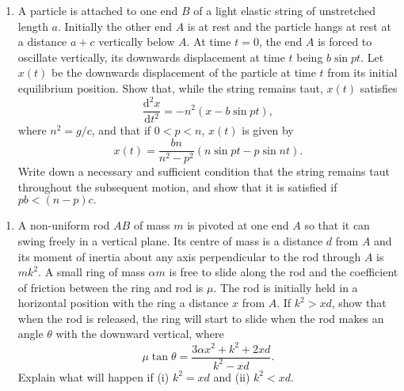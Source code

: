 \documentclass[a4, 11pt]{report}
\newlength{\qspace}
\newcounter{qnumber}
\newenvironment{question}%
 {\vspace{\qspace}
  \begin{enumerate}[\bfseries 1\quad][10]%
    \setcounter{enumi}{\value{qnumber}}%
    \item%
 }
{
  \end{enumerate}
  \filbreak
  \stepcounter{qnumber}
 }
\begin{document}
\begin{question}	
A particle is attached to one end $B$ of a light elastic string of
unstretched length $a$. Initially the other end $A$ is at rest and
the particle hangs at rest at a distance $a+c$ vertically below $A$.
At time $t=0$, the end $A$ is forced to oscillate vertically, its
downwards displacement at time $t$ being $b\sin pt$. Let $x(t)$
be the downwards displacement of the particle at time $t$ from its
initial equilibrium position. Show that, while the string remains
taut, $x(t)$ satisfies 
\[
\frac{\mathrm{d}^{2}x}{\mathrm{d}t^{2}}=-n^{2}(x-b\sin pt),
\]
where $n^{2}=g/c$, and that if $0<p<n$, $x(t)$ is given by 
\[
x(t)=\frac{bn}{n^{2}-p^{2}}(n\sin pt-p\sin nt).
\]
Write down a necessary and sufficient condition that the string remains
taut throughout the subsequent motion, and show that it is satisfied
if $pb<(n-p)c.$ 
\end{question}


\begin{question}
A non-uniform rod $AB$ of mass $m$ is pivoted at one end $A$ so
that it can swing freely in a vertical plane. Its centre of mass is
a distance $d$ from $A$ and its moment of inertia about any axis
perpendicular to the rod through $A$ is $mk^{2}.$ A small ring of
mass $\alpha m$ is free to slide along the rod and the coefficient
of friction between the ring and rod is $\mu.$ The rod is initially
held in a horizontal position with the ring a distance $x$ from $A$.
If $k^{2}>xd$, show that when the rod is released, the ring will
start to slide when the rod makes an angle $\theta$ with the downward
vertical, where 
\[
\mu\tan\theta=\frac{3\alpha x^{2}+k^{2}+2xd}{k^{2}-xd}.
\]
Explain what will happen if (i) $k^{2}=xd$ and (ii) $k^{2}<xd$.
\end{question}
	
\end{document}
